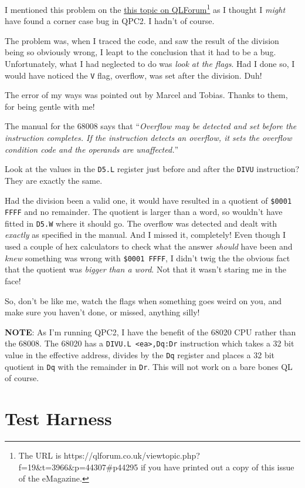 I mentioned this problem on the \href{https://qlforum.co.uk/viewtopic.php?f=19&t=3966&p=44307\#p44295}{this topic on QLForum}\footnote{The URL is https://qlforum.co.uk/viewtopic.php?f=19\&t=3966\&p=44307\#p44295
if you have printed out a copy of this issue of the eMagazine.} as I thought I \emph{might} have found a corner case bug in QPC2.
I hadn't of course.

The problem was, when I traced the code, and saw the result of the
division being so obviously wrong, I leapt to the conclusion that
it had to be a bug. Unfortunately, what I had neglected to do was
\emph{look at the flags}. Had I done so, I would have noticed the
\texttt{V} flag, overflow, was set after the division. Duh!

The error of my ways was pointed out by Marcel and Tobias. Thanks
to them, for being gentle with me!

The manual for the 68008 says that ``\emph{Overflow may be detected
and set before the instruction completes. If the instruction detects
an overflow, it sets the overflow condition code and the operands
are unaffected.}''

Look at the values in the \texttt{D5.L} register just before and after
the \texttt{DIVU} instruction? They are exactly the same. 

Had the division been a valid one, it would have resulted in a quotient
of \texttt{\$0001 FFFF} and no remainder. The quotient is larger than
a word, so wouldn't have fitted in \texttt{D5.W} where it should go.
The overflow was detected and dealt with \emph{exactly} as specified
in the manual. And I missed it, completely! Even though I used a couple
of hex calculators to check what the answer \emph{should} have been
and \emph{knew} something was wrong with \texttt{\$0001 FFFF}, I didn't
twig the the obvious fact that the quotient was \emph{bigger than
a word}. Not that it wasn't staring me in the face!

So, don't be like me, watch the flags when something goes weird on
you, and make sure you haven't done, or missed, anything silly!

\textbf{NOTE}: As I'm running QPC2, I have the benefit of the 68020
CPU rather than the 68008. The 68020 has a \texttt{DIVU.L <ea>,Dq:Dr}
instruction which takes a 32 bit value in the effective address, divides
by the \texttt{Dq} register and places a 32 bit quotient in \texttt{Dq}
with the remainder in \texttt{Dr}. This will not work on a bare bones
QL of course.

\section{Test Harness}

